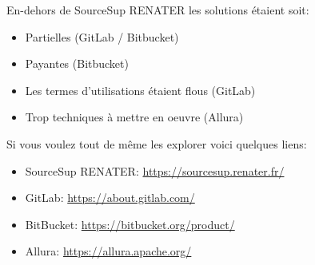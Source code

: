\documentclass{beamer}
\begin{document}
\begin{frame}
En-dehors de SourceSup RENATER les solutions étaient soit:

\begin{itemize}
	\item Partielles (GitLab / Bitbucket)
	\item Payantes (Bitbucket)
	\item Les termes d'utilisations étaient flous (GitLab)
	\item Trop techniques à mettre en oeuvre (Allura)
\end{itemize}
\medskip

Si vous voulez tout de même les explorer voici quelques liens:
\begin{itemize}
	\item SourceSup RENATER: \url{https://sourcesup.renater.fr/}
	\item GitLab: \url{https://about.gitlab.com/}
	\item BitBucket: \url{https://bitbucket.org/product/}
	\item Allura: \url{https://allura.apache.org/}
\end{itemize}
\end{frame}


\end{document}
